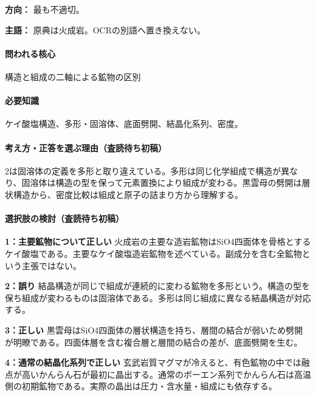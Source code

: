 \noindent\textbf{方向：} 最も不適切。\par

\noindent\textbf{主語：} 原典は火成岩。OCRの別語へ置き換えない。\par

\paragraph{問われる核心} 構造と組成の二軸による鉱物の区別

\paragraph{必要知識} ケイ酸塩構造、多形・固溶体、底面劈開、結晶化系列、密度。

\paragraph{考え方・正答を選ぶ理由（査読待ち初稿）} 2は固溶体の定義を多形と取り違えている。多形は同じ化学組成で構造が異なり、固溶体は構造の型を保って元素置換により組成が変わる。黒雲母の劈開は層状構造から、密度比較は組成と原子の詰まり方から理解する。

\paragraph{選択肢の検討（査読待ち初稿）}\mbox{}\par

\noindent\textbf{1：主要鉱物について正しい} 火成岩の主要な造岩鉱物はSiO4四面体を骨格とするケイ酸塩である。主要なケイ酸塩造岩鉱物を述べている。副成分を含む全鉱物という主張ではない。\par

\noindent\textbf{2：誤り} 結晶構造が同じで組成が連続的に変わる鉱物を多形という。構造の型を保ち組成が変わるものは固溶体である。多形は同じ組成に異なる結晶構造が対応する。\par

\noindent\textbf{3：正しい} 黒雲母はSiO4四面体の層状構造を持ち、層間の結合が弱いため劈開が明瞭である。四面体層を含む複合層と層間の結合の差が、底面劈開を生む。\par

\noindent\textbf{4：通常の結晶化系列で正しい} 玄武岩質マグマが冷えると、有色鉱物の中では融点が高いかんらん石が最初に晶出する。通常のボーエン系列でかんらん石は高温側の初期鉱物である。実際の晶出は圧力・含水量・組成にも依存する。\par

